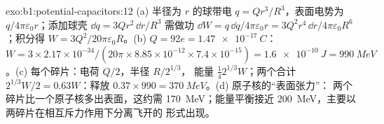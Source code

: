 \begin{solution}{exo:b1:potential-capacitors:12}
(a) 半径为 $r$ 的球带电 $q = Qr^3/R^3$，表面电势为
$q/4\pi\varepsilon_0r$；添加球壳 $\dd q = 3Qr^2\,\dd r/R^3$ 需做功 $\dd W =
q\,\dd q/4\pi\varepsilon_0r = 3Q^2r^4\,\dd r/4\pi\varepsilon_0R^6$；积分得 $W =
3Q^2/20\pi\varepsilon_0R$。(b) $Q = 92e = \qty{1.47e-17}{C}$：$W = 3 \times 2.17 \times
10^{-34}/(20\pi \times 8.85 \times 10^{-12} \times 7.4 \times 10^{-15}) = \qty{1.6e-10}{J}
= \qty{990}{MeV}$。(c) 每个碎片：电荷 $Q/2$，半径 $R/2^{1/3}$，
能量 $\tfrac14 2^{1/3}W$；两个合计 $2^{1/3}W/2 = 0.63W$：释放
$0.37 \times 990 = \qty{370}{MeV}$。(d) 原子核的“表面张力”：
两个碎片比一个原子核多出表面，这约需
\qty{170}{MeV}；能量平衡接近 \qty{200}{MeV}，主要以
两碎片在相互斥力作用下分离飞开的
形式出现。
\end{solution}

